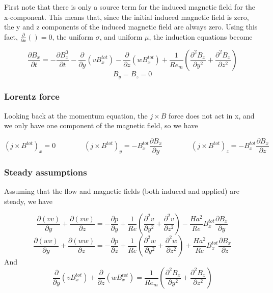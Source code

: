 \documentclass[11pt]{article}
\begin{document}
First note that there is only a source term for the induced magnetic field for the x-component. This means that, since the initial induced magnetic field is zero, the y and z components of the induced magnetic field are always zero. Using this fact, $\frac{\partial}{\partial x} ()=0$, the uniform $\sigma$, and uniform $\mu$, the induction equations become


\begin{equation}
	\frac{\partial B_x}{\partial t} 
	=
	- \frac{\partial B_x^0}{\partial t}
	- \frac{\partial}{\partial y} (v B_x^{tot})
	- \frac{\partial}{\partial z} (w B_x^{tot})
	+ \frac{1}{Re_m}
	\left(
	\frac{\partial^2 B_x}{\partial y^2}
	+
	\frac{\partial^2 B_x}{\partial z^2}
	\right)
\end{equation}
\begin{equation}
	B_y = B_z = 0
\end{equation}

\subsubsection{Lorentz force}

Looking back at the momentum equation, the $j\times B$ force does not act in x, and we only have one component of the magnetic field, so we have

\begin{equation}
	(j \times B^{tot})_x = 0
	\qquad \qquad
	(j \times B^{tot})_y = -	B_x^{tot} \frac{\partial B_x}{\partial y} 
	\qquad \qquad
	(j \times B^{tot})_z = - B_x^{tot} \frac{\partial B_x}{\partial z} 
\end{equation}

\subsubsection{Steady assumptions}
Assuming that the flow and magnetic fields (both induced and applied) are steady, we have

\begin{equation}
	\frac{\partial (v v)}{\partial y}
	+ \frac{\partial (v w)}{\partial z}
	= 
	- \frac{\partial p}{\partial y}
	+ \frac{1}{Re}
	\left(
	\frac{\partial^2 v}{\partial y^2}
	+\frac{\partial^2 v}{\partial z^2}
	\right)
	- 
	\frac{Ha^2}{Re}
	B_x^{tot}
	\frac{\partial B_x}{\partial y} 
\end{equation}
\begin{equation}
	\frac{\partial (w v)}{\partial y}
	+ \frac{\partial (w w)}{\partial z}
	= 
	- \frac{\partial p}{\partial z}
	+ \frac{1}{Re}
	\left(
	\frac{\partial^2 w}{\partial y^2}
	+\frac{\partial^2 w}{\partial z^2}
	\right)
	+ \frac{Ha^2}{Re}
	B_x^{tot}
	\frac{\partial B_x}{\partial z} 
\end{equation}
And
\begin{equation}
	\frac{\partial}{\partial y} (v B_x^{tot})
	+ \frac{\partial}{\partial z} (w B_x^{tot})
	=
	\frac{1}{Re_m}
	\left(
	\frac{\partial^2 B_x}{\partial y^2}
	+
	\frac{\partial^2 B_x}{\partial z^2}
	\right)
\end{equation}
\end{document}
